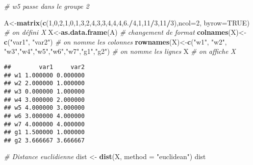 \documentclass[
]{article}
\newenvironment{Shaded}{\begin{snugshade}}{\end{snugshade}}
\newcommand{\CommentTok}[1]{\textcolor[rgb]{0.56,0.35,0.01}{\textit{#1}}}
\newcommand{\DataTypeTok}[1]{\textcolor[rgb]{0.13,0.29,0.53}{#1}}
\newcommand{\DecValTok}[1]{\textcolor[rgb]{0.00,0.00,0.81}{#1}}
\newcommand{\FloatTok}[1]{\textcolor[rgb]{0.00,0.00,0.81}{#1}}
\newcommand{\KeywordTok}[1]{\textcolor[rgb]{0.13,0.29,0.53}{\textbf{#1}}}
\newcommand{\NormalTok}[1]{#1}
\newcommand{\OperatorTok}[1]{\textcolor[rgb]{0.81,0.36,0.00}{\textbf{#1}}}
\newcommand{\OtherTok}[1]{\textcolor[rgb]{0.56,0.35,0.01}{#1}}
\newcommand{\StringTok}[1]{\textcolor[rgb]{0.31,0.60,0.02}{#1}}
\begin{document}
\begin{Shaded}
\begin{Highlighting}[]
\CommentTok{# w5 passe dans le groupe 2}

\NormalTok{A<-}\KeywordTok{matrix}\NormalTok{(}\KeywordTok{c}\NormalTok{(}\DecValTok{1}\NormalTok{,}\DecValTok{0}\NormalTok{,}\DecValTok{2}\NormalTok{,}\DecValTok{1}\NormalTok{,}\DecValTok{0}\NormalTok{,}\DecValTok{1}\NormalTok{,}\DecValTok{3}\NormalTok{,}\DecValTok{2}\NormalTok{,}\DecValTok{4}\NormalTok{,}\DecValTok{3}\NormalTok{,}\DecValTok{3}\NormalTok{,}\DecValTok{4}\NormalTok{,}\DecValTok{4}\NormalTok{,}\DecValTok{4}\NormalTok{,}\FloatTok{6.}\OperatorTok{/}\DecValTok{4}\NormalTok{,}\DecValTok{1}\NormalTok{,}\DecValTok{11}\OperatorTok{/}\DecValTok{3}\NormalTok{,}\DecValTok{11}\OperatorTok{/}\DecValTok{3}\NormalTok{),}\DataTypeTok{ncol=}\DecValTok{2}\NormalTok{, }\DataTypeTok{byrow=}\OtherTok{TRUE}\NormalTok{) }\CommentTok{# on défini X}
\NormalTok{X<-}\KeywordTok{as.data.frame}\NormalTok{(A) }\CommentTok{# changement de format}
\KeywordTok{colnames}\NormalTok{(X)<-}\KeywordTok{c}\NormalTok{(}\StringTok{"var1"}\NormalTok{, }\StringTok{"var2"}\NormalTok{) }\CommentTok{# on nomme les colonnes}
\KeywordTok{rownames}\NormalTok{(X)<-}\KeywordTok{c}\NormalTok{(}\StringTok{"w1"}\NormalTok{, }\StringTok{"w2"}\NormalTok{, }\StringTok{"w3"}\NormalTok{,}\StringTok{"w4"}\NormalTok{,}\StringTok{"w5"}\NormalTok{,}\StringTok{"w6"}\NormalTok{,}\StringTok{"w7"}\NormalTok{,}\StringTok{"g1"}\NormalTok{,}\StringTok{"g2"}\NormalTok{) }\CommentTok{# on nomme les lignes}
\NormalTok{X }\CommentTok{# on affiche X}
\end{Highlighting}
\end{Shaded}

\begin{verbatim}
##        var1     var2
## w1 1.000000 0.000000
## w2 2.000000 1.000000
## w3 0.000000 1.000000
## w4 3.000000 2.000000
## w5 4.000000 3.000000
## w6 3.000000 4.000000
## w7 4.000000 4.000000
## g1 1.500000 1.000000
## g2 3.666667 3.666667
\end{verbatim}

\begin{Shaded}
\begin{Highlighting}[]
\CommentTok{# Distance euclidienne}
\NormalTok{dist <-}\StringTok{ }\KeywordTok{dist}\NormalTok{(X, }\DataTypeTok{method =} \StringTok{"euclidean"}\NormalTok{)}
\NormalTok{dist}
\end{Highlighting}
\end{Shaded}
\end{document}

